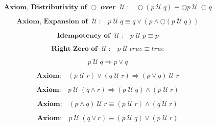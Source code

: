 \documentclass[fleqn, leqno]{article}
\newcommand{\until}{\;\mathcal{U}\;}
\newcommand{\next}{\bigcirc}
\newcommand{\spacer}{\vspace{-30pt}}
\begin{document}
\begin{equation}\label{E:distNextUntil}
\textbf{Axiom, Distributivity of $\next$ over $\until$:}\quad \next (p \until q) \equiv \next p \until \next q
\end{equation}

\spacer

\begin{equation}\label{E:expansionUntil}
\textbf{Axiom, Expansion of $\until$:}\quad p \until q \equiv q \lor (p \land \next (p \until q))
\end{equation}

\spacer

\begin{equation}\label{E:idemUntil}
\textbf{Idempotency of $\until$:}\quad p \until p \equiv p
\end{equation}

\spacer

\begin{equation}\label{E:zeroUntil}
\textbf{Right Zero of $\until$:}\quad p \until true \equiv true
\end{equation}

\spacer

\begin{equation}\label{E:untilImpOr}
p \until q \Rightarrow p \lor q
\end{equation}

\spacer

\begin{equation}\label{E:untilOrImp}
\textbf{Axiom:}\quad (p \until r) \lor (q \until r) \Rightarrow (p \lor q) \until r
\end{equation}

\spacer

\begin{equation}\label{E:untilAndImp}
\textbf{Axiom:}\quad p \until (q \land r) \Rightarrow (p \until q) \land (p \until r)
\end{equation}

\spacer

\begin{equation}\label{E:untilAndEquiv}
\textbf{Axiom:}\quad (p \land q) \until r \equiv (p \until r) \land (q \until r)
\end{equation}

\spacer

\begin{equation}\label{E:untilOrEquiv}
\textbf{Axiom:}\quad p \until (q \lor r) \equiv (p \until q) \lor (p \until r)
\end{equation}
\end{document}
